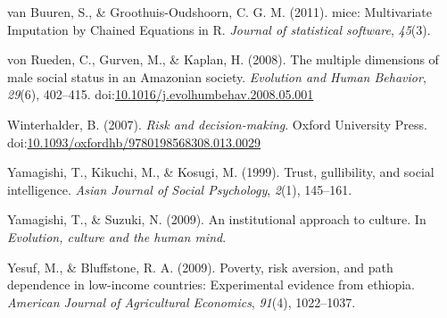 \documentclass[
  11pt,
]{article}
\begin{document}
\leavevmode\hypertarget{ref-f332b76985cd4d13818f5799cb957366}{}%
van Buuren, S., \& Groothuis-Oudshoorn, C. G. M. (2011). mice:
Multivariate Imputation by Chained Equations in R. \emph{Journal of
statistical software}, \emph{45}(3).

\leavevmode\hypertarget{ref-vonruedenMultipleDimensionsMale2008}{}%
von Rueden, C., Gurven, M., \& Kaplan, H. (2008). The multiple
dimensions of male social status in an Amazonian society.
\emph{Evolution and Human Behavior}, \emph{29}(6), 402--415.
doi:\href{https://doi.org/10.1016/j.evolhumbehav.2008.05.001}{10.1016/j.evolhumbehav.2008.05.001}

\leavevmode\hypertarget{ref-winterhalderRiskDecisionmaking2007}{}%
Winterhalder, B. (2007). \emph{Risk and decision-making}. Oxford
University Press.
doi:\href{https://doi.org/10.1093/oxfordhb/9780198568308.013.0029}{10.1093/oxfordhb/9780198568308.013.0029}

\leavevmode\hypertarget{ref-yamagishi1999trust}{}%
Yamagishi, T., Kikuchi, M., \& Kosugi, M. (1999). Trust, gullibility,
and social intelligence. \emph{Asian Journal of Social Psychology},
\emph{2}(1), 145--161.

\leavevmode\hypertarget{ref-yamagishiInstitutionalApproachCulture2009}{}%
Yamagishi, T., \& Suzuki, N. (2009). An institutional approach to
culture. In \emph{Evolution, culture and the human mind}.

\leavevmode\hypertarget{ref-yesuf2009poverty}{}%
Yesuf, M., \& Bluffstone, R. A. (2009). Poverty, risk aversion, and path
dependence in low-income countries: Experimental evidence from ethiopia.
\emph{American Journal of Agricultural Economics}, \emph{91}(4),
1022--1037.
\end{document}
